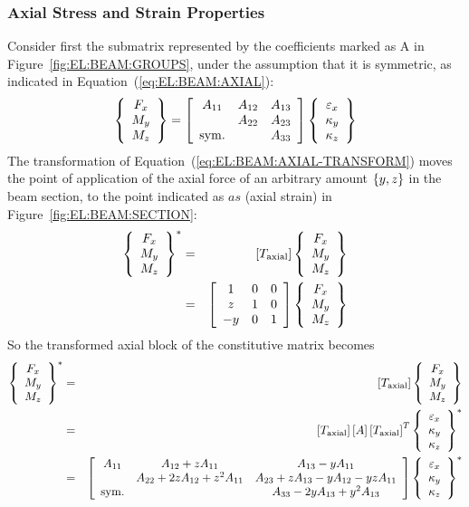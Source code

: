 \subsubsection{Axial Stress and Strain Properties}
Consider first the submatrix represented by the coefficients 
marked as A in Figure~\ref{fig:EL:BEAM:GROUPS}, under the assumption 
that it is symmetric, as indicated in Equation~(\ref{eq:EL:BEAM:AXIAL}):
\begin{equation}
	\cubr{\cvvect{
		F_x \\
		M_y \\
		M_z
	}} = \sqbr{\matr{ccc}{
		A_{11} & A_{12} & A_{13} \\
		 & A_{22} & A_{23} \\
		\llk{sym.} & & A_{33}
	}}\cubr{\cvvect{
		\varepsilon_x \\
		\kappa_y \\
		\kappa_z
	}}
	\label{eq:EL:BEAM:AXIAL}
\end{equation}
The transformation of Equation~(\ref{eq:EL:BEAM:AXIAL-TRANSFORM})
moves the point of application of the axial force 
of an arbitrary amount $\left\{ y,z \right\}$ in the beam section, to the point
indicated as $as$ (axial strain) in Figure~\ref{fig:EL:BEAM:SECTION}:
\begin{eqnarray}
	\cubr{\cvvect{
		F_x \\
		M_y \\
		M_z
	}}^*
	& = & \sqbr{T_{\llk{axial}}}\cubr{\cvvect{
		F_x \\
		M_y \\
		M_z
	}}
	\nonumber \\
	& = & \sqbr{\matr{ccc}{
		 1 & 0 & 0 \\
		 z & 1 & 0 \\
		-y & 0 & 1
	}}\cubr{\cvvect{
		F_x \\
		M_y \\
		M_z
	}}
	\label{eq:EL:BEAM:AXIAL-TRANSFORM}
\end{eqnarray}
So the transformed axial block of the constitutive matrix becomes
\begin{eqnarray}
	\cubr{\cvvect{
		F_x \\
		M_y \\
		M_z
	}}^*
	& = & \sqbr{T_{\llk{axial}}}
	\cubr{\cvvect{
		F_x \\
		M_y \\
		M_z
	}}
	\nonumber \\
	& = & \sqbr{T_{\llk{axial}}} \sqbr{A} \sqbr{T_{\llk{axial}}}^T
	\cubr{\cvvect{
		\varepsilon_x \\
		\kappa_y \\
		\kappa_z
	}}^*
	\label{eq:EL:BEAM:AXIAL-TRANSFORMED}
	\\
	& = &
	\sqbr{\matr{ccc}{
		A_{11} & A_{12} + z A_{11} & A_{13} - y A_{11} \\
		& A_{22} + 2 z A_{12} + z^2 A_{11} & 
			A_{23} + z A_{13} - y A_{12} - yz A_{11} \\
		\llk{sym.} &  & A_{33} - 2 y A_{13} + y^2 A_{13}
	}}\cubr{\cvvect{
		\varepsilon_x \\
		\kappa_y \\
		\kappa_z
	}}^*
	\nonumber
\end{eqnarray}
